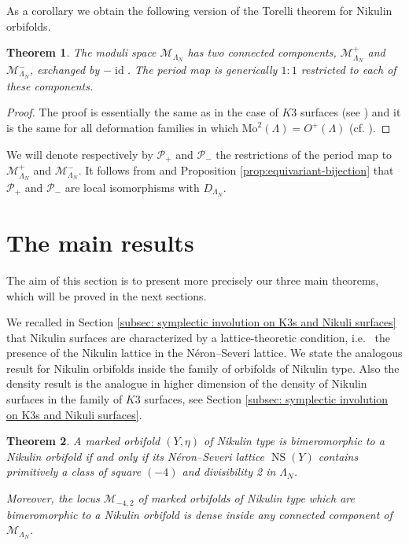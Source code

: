 \documentclass{amsart}
\newtheorem{thm}{Theorem}[section]
\theoremstyle{definition}
\numberwithin{equation}{section}
\numberwithin{equation}{section} \theoremstyle{definition}
\DeclareMathOperator{\NS}{NS}
\DeclareMathOperator{\id}{id}
\begin{document}
As a corollary we obtain the following version of the Torelli theorem for Nikulin orbifolds.
\begin{thm}\label{prop:connected components of moduli}
The moduli space $\mathcal{M}_{\Lambda_N}$ has two connected components, $\mathcal{M}_{\Lambda_N}^+$ and $\mathcal{M}_{\Lambda_N}^-$, exchanged by $-\id$. The period map is generically $1:1$ restricted to each of these components.
\end{thm}
\begin{proof}
The proof is essentially the same as in the case of $K3$ surfaces (see \cite[Proposition 7.5.4]{HuybrechtsK3}) and it is the same for all deformation families in which $\mathrm{Mo}^2(\Lambda)=O^+(\Lambda)$ (cf. \cite[note added in proof]{Onorati}).
\end{proof}
We will denote respectively by $\mathcal{P}_+$ and $\mathcal{P}_-$ the restrictions of the period map to $\mathcal{M}_{\Lambda_N}^+$ and $\mathcal{M}_{\Lambda_N}^-$. It follows from \cite[]{MenetTorelli} and Proposition \ref{prop:equivariant-bijection} that $\mathcal{P}_+$ and $\mathcal{P}_-$ are local isomorphisms with $D_{\Lambda_N}$.


\section{The main results}\label{section: The main results}
The aim of this section is to present more precisely our three main theorems, which will be proved in the next sections.

We recalled in Section \ref{subsec: symplectic involution on K3s and Nikuli surfaces} that Nikulin surfaces are characterized by a lattice-theoretic condition, i.e.~ the presence of the Nikulin lattice in the N\'eron--Severi lattice. We state the analogous result for  Nikulin orbifolds inside the family of orbifolds of Nikulin type. Also the density result is the analogue in higher dimension of the density of Nikulin surfaces in the family of $K3$ surfaces, see Section \ref{subsec: symplectic involution on K3s and Nikuli surfaces}.


\begin{thm}\label{Thm1.1}
    A marked orbifold $(Y,\eta)$ of Nikulin type is bimeromorphic to a Nikulin orbifold if and only if its N\'eron--Severi lattice $\NS(Y)$ contains primitively a class of square $(-4)$ and divisibility 2 in $\Lambda_N$.
    
    Moreover, the locus $\mathcal{M}_{-4,2}$ of marked orbifolds of Nikulin type which are bimeromorphic to a Nikulin orbifold is dense inside any connected component of $\mathcal{M}_{\Lambda_N}$.
\end{thm}
\end{document}
